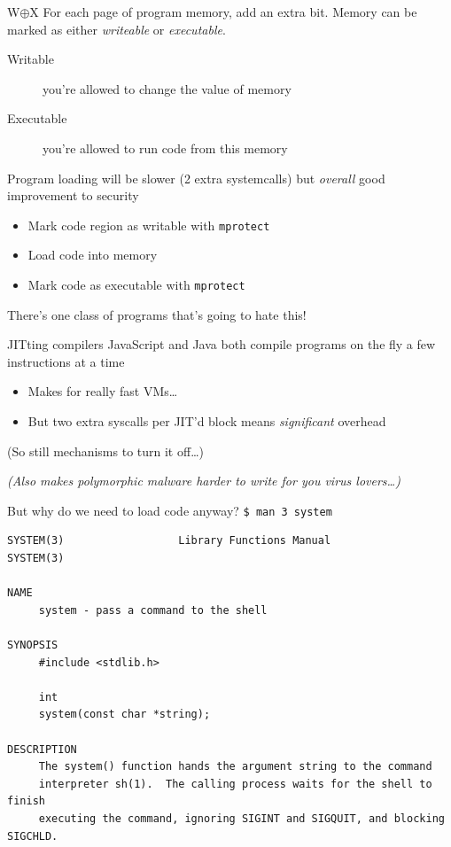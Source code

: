 \documentclass[9pt,aspectratio=169]{beamer}
\begin{document}
\begin{frame}[label={sec:org11c474b},fragile]{W\(\oplus\)X}
 For each page of program memory, add an extra bit.
Memory can be marked as either \emph{writeable} or \emph{executable}.

\begin{description}
\item[{Writable}] you're allowed to change the value of memory
\item[{Executable}] you're allowed to run code from this memory
\end{description}

Program loading will be slower (2 extra systemcalls) but  \emph{overall} good improvement to security
\begin{itemize}
\item Mark code region as writable with \texttt{mprotect}
\item Load code into memory
\item Mark code as executable with \texttt{mprotect}
\end{itemize}

\begin{block}{There's one class of programs that's going to hate this!}
\end{block}
\end{frame}

\begin{frame}[label={sec:orgb024c08}]{JITting compilers}
JavaScript and Java both compile programs on the fly a few instructions at a time
\begin{itemize}
\item Makes for really fast VMs\ldots{}
\item But two extra syscalls per JIT'd block means \emph{significant} overhead
\end{itemize}

(So still mechanisms to turn it off\ldots{})

\vfill
\footnotesize
\emph{(Also makes polymorphic malware harder to write for you virus lovers\ldots{})}
\end{frame}

\begin{frame}[label={sec:orgac5720d},fragile]{But why do we need to load code anyway?}
 \texttt{\$ man 3 system}

\begin{verbatim}
SYSTEM(3)                  Library Functions Manual                  SYSTEM(3)

NAME
     system - pass a command to the shell

SYNOPSIS
     #include <stdlib.h>

     int
     system(const char *string);

DESCRIPTION
     The system() function hands the argument string to the command
     interpreter sh(1).  The calling process waits for the shell to finish
     executing the command, ignoring SIGINT and SIGQUIT, and blocking SIGCHLD.
\end{verbatim}
\end{frame}
\end{document}

